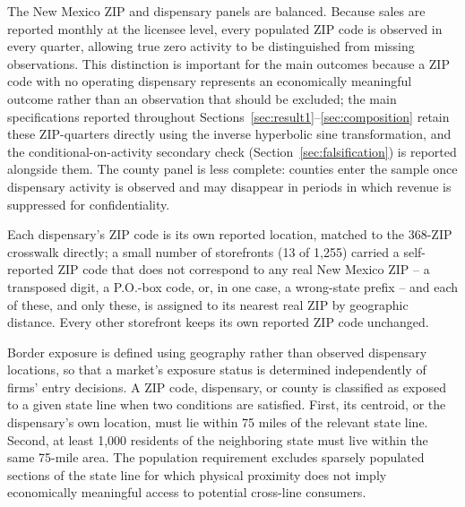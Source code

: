 \documentclass[english,12pt]{article}
\begin{document}
The New Mexico ZIP and dispensary panels are balanced. Because sales are reported monthly at the licensee level, every populated ZIP code is observed in every quarter, allowing true zero activity to be distinguished from missing observations. This distinction is important for the main outcomes because a ZIP code with no operating dispensary represents an economically meaningful outcome rather than an observation that should be excluded; the main specifications reported throughout Sections~\ref{sec:result1}--\ref{sec:composition} retain these ZIP-quarters directly using the inverse hyperbolic sine transformation, and the conditional-on-activity secondary check (Section~\ref{sec:falsification}) is reported alongside them. The county panel is less complete: counties enter the sample once dispensary activity is observed and may disappear in periods in which revenue is suppressed for confidentiality.

Each dispensary's ZIP code is its own reported location, matched to the 368-ZIP crosswalk directly; a small number of storefronts (13 of 1,255) carried a self-reported ZIP code that does not correspond to any real New Mexico ZIP -- a transposed digit, a P.O.-box code, or, in one case, a wrong-state prefix -- and each of these, and only these, is assigned to its nearest real ZIP by geographic distance. Every other storefront keeps its own reported ZIP code unchanged.

Border exposure is defined using geography rather than observed dispensary locations, so that a market's exposure status is determined independently of firms' entry decisions. A ZIP code, dispensary, or county is classified as exposed to a given state line when two conditions are satisfied. First, its centroid, or the dispensary's own location, must lie within 75 miles of the relevant state line. Second, at least 1,000 residents of the neighboring state must live within the same 75-mile area. The population requirement excludes sparsely populated sections of the state line for which physical proximity does not imply economically meaningful access to potential cross-line consumers.
\end{document}
